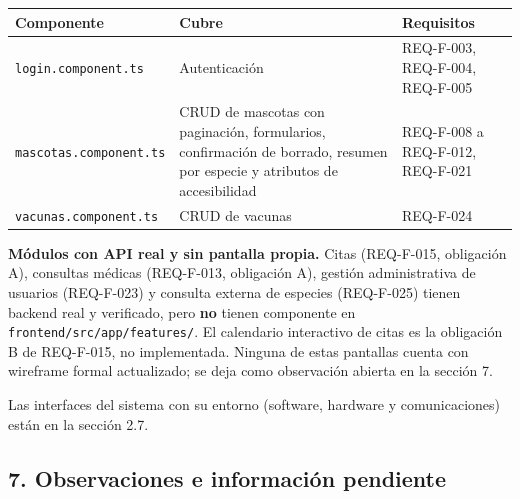 \documentclass[
  spanish,
]{article}
\newcounter{none} %
\begin{document}
{\def\LTcaptype{none} %
\begin{longtable}[]{@{}
  >{\raggedright\arraybackslash}p{}
  >{\raggedright\arraybackslash}p{}
  >{\raggedright\arraybackslash}p{}@{}}
\toprule\noalign{}
\begin{minipage}[b]{\linewidth}\raggedright
Componente
\end{minipage} & \begin{minipage}[b]{\linewidth}\raggedright
Cubre
\end{minipage} & \begin{minipage}[b]{\linewidth}\raggedright
Requisitos
\end{minipage} \\
\midrule\noalign{}
\endhead
\bottomrule\noalign{}
\endlastfoot
\texttt{login.\allowbreak{}component.\allowbreak{}ts} & Autenticación & REQ-F-003, REQ-F-004,
REQ-F-005 \\
\texttt{mascotas.\allowbreak{}component.\allowbreak{}ts} & CRUD de mascotas con paginación,
formularios, confirmación de borrado, resumen por especie y atributos de
accesibilidad & REQ-F-008 a REQ-F-012, REQ-F-021 \\
\texttt{vacunas.\allowbreak{}component.\allowbreak{}ts} & CRUD de vacunas & REQ-F-024 \\
\end{longtable}
}

\textbf{Módulos con API real y sin pantalla propia.} Citas (REQ-F-015,
obligación A), consultas médicas (REQ-F-013, obligación A), gestión
administrativa de usuarios (REQ-F-023) y consulta externa de especies
(REQ-F-025) tienen backend real y verificado, pero \textbf{no} tienen
componente en \texttt{frontend/\allowbreak{}src/\allowbreak{}app/\allowbreak{}features/}. El calendario
interactivo de citas es la obligación B de REQ-F-015, no implementada.
Ninguna de estas pantallas cuenta con wireframe formal actualizado; se
deja como observación abierta en la sección 7.

Las interfaces del sistema con su entorno (software, hardware y
comunicaciones) están en la sección 2.7.

\subsection{7. Observaciones e información
pendiente}\label{observaciones-e-informaciuxf3n-pendiente}
\end{document}
